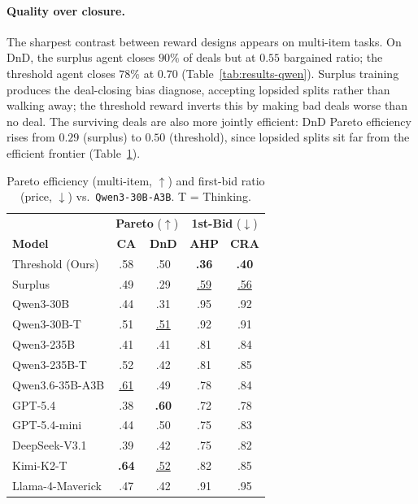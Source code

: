 \documentclass[11pt]{article}
\newcommand{\model}[1]{\texttt{#1}}
\newcommand{\lightrule}{\arrayrulecolor{black!20}\midrule\arrayrulecolor{black}}
\begin{document}
\paragraph{Quality over closure.}
The sharpest contrast between reward designs appears on multi-item tasks. On DnD, the surplus agent closes $90\%$ of deals but at $0.55$ bargained ratio; the threshold agent closes $78\%$ at $0.70$ (Table~\ref{tab:results-qwen}). Surplus training produces the deal-closing bias \citet{bergemann2026bilateral} diagnose, accepting lopsided splits rather than walking away; the threshold reward inverts this by making bad deals worse than no deal. The surviving deals are also more jointly efficient: DnD Pareto efficiency rises from $0.29$ (surplus) to $0.50$ (threshold), since lopsided splits sit far from the efficient frontier (Table~\ref{tab:fbr_pareto_vs_qwen}).

\begin{table}[!t]
\centering
\scriptsize
\setlength{\tabcolsep}{3pt}
\renewcommand{\arraystretch}{1.15}
\begin{tabular}{l cc cc}
\toprule
\rowcolor{tableheader}
& \multicolumn{2}{c}{\textbf{Pareto} ($\uparrow$)} & \multicolumn{2}{c}{\textbf{1st-Bid} ($\downarrow$)} \\
\rowcolor{tableheader}
\textbf{Model} & \textbf{CA} & \textbf{DnD} & \textbf{AHP} & \textbf{CRA} \\
\midrule
\rowcolor{tablerow}
Threshold (Ours) & .58          & .50          & \textbf{.36} & \textbf{.40} \\
Surplus   & .49          & .29          & \underline{.59} & \underline{.56} \\
\lightrule
\rowcolor{tablerow}
Qwen3-30B        & .44          & .31          & .95          & .92 \\
Qwen3-30B-T      & .51          & \underline{.51} & .92       & .91 \\
\rowcolor{tablerow}
Qwen3-235B       & .41          & .41          & .81          & .84 \\
Qwen3-235B-T     & .52          & .42          & .81          & .85 \\
\rowcolor{tablerow}
Qwen3.6-35B-A3B  & \underline{.61} & .49          & .78          & .84 \\
GPT-5.4          & .38          & \textbf{.60} & .72          & .78 \\
\rowcolor{tablerow}
GPT-5.4-mini     & .44          & .50          & .75          & .83 \\
DeepSeek-V3.1    & .39          & .42          & .75          & .82 \\
\rowcolor{tablerow}
Kimi-K2-T        & \textbf{.64} & \underline{.52} & .82       & .85 \\
Llama-4-Maverick      & .47          & .42          & .91          & .95 \\
\bottomrule
\end{tabular}
\caption{Pareto efficiency (multi-item, $\uparrow$) and first-bid ratio (price, $\downarrow$) vs.\ \model{Qwen3-30B-A3B}. T = Thinking.}
\label{tab:fbr_pareto_vs_qwen}
\end{table}
\end{document}
